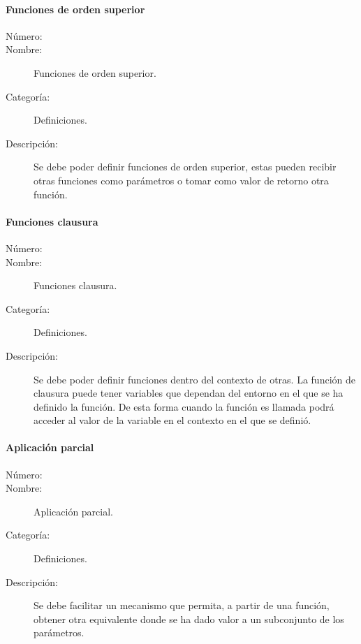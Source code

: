 \paragraph{Funciones de orden superior}
\begin{framed}
	\begin{description}
		\item [Número:] \cn
		\item [Nombre:]  Funciones de orden superior.
		\item [Categoría:] Definiciones.
		\item [Descripción:] Se debe poder definir funciones de orden superior, estas pueden recibir otras funciones como parámetros o tomar como valor de 
      retorno otra función.  
	\end{description}
\end{framed}

\paragraph{Funciones clausura}
\begin{framed}
	\begin{description}
		\item [Número:] \cn
		\item [Nombre:]  Funciones clausura.
		\item [Categoría:] Definiciones.
		\item [Descripción:] Se debe poder definir funciones dentro del contexto de otras. La función de clausura puede tener variables que dependan 
      del entorno en el que se ha definido la función. De esta forma cuando la función es llamada podrá acceder al valor de la variable en el contexto
      en el que se definió.
	\end{description}
\end{framed}

\paragraph{Aplicación parcial}
\begin{framed}
	\begin{description}
		\item [Número:] \cn
		\item [Nombre:] Aplicación parcial.
		\item [Categoría:] Definiciones.
		\item [Descripción:] Se debe facilitar un mecanismo que permita, a partir de una función, obtener otra
      equivalente donde se ha dado valor a un subconjunto de los parámetros.
    \end{description}
\end{framed}

